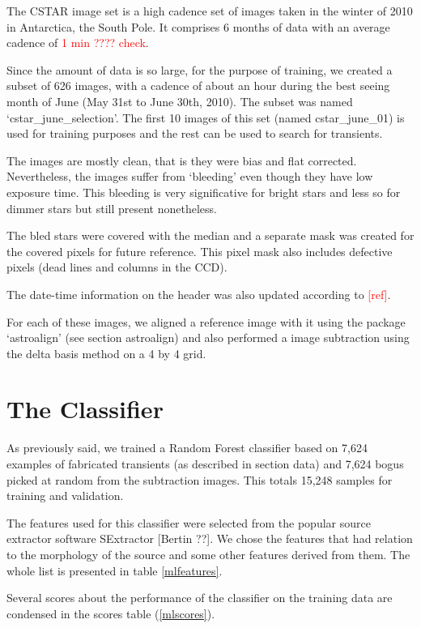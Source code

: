 The CSTAR image set is a high cadence set of images taken in the winter of 2010 in Antarctica, the South Pole. It comprises 6 months of data with an average cadence of \textcolor{red}{1 min ???? check}.

Since the amount of data is so large, for the purpose of training, we created a subset of 626 images, with a cadence of about an hour during the best seeing month of June (May 31st to June 30th, 2010). The subset was named `cstar\_june\_selection'. The first 10 images of this set (named cstar\_june\_01) is used for training purposes and the rest can be used to search for transients. 

The images are mostly clean, that is they were bias and flat corrected.
Nevertheless, the images suffer from `bleeding' even though they have low exposure time. This bleeding is very significative for bright stars and less so for dimmer stars but still present nonetheless.

The bled stars were covered with the median and a separate mask was created for the covered pixels for future reference. This pixel mask also includes defective pixels (dead lines and columns in the CCD).

The date-time information on the header was also updated according to \textcolor{red}{[ref]}.

For each of these images, we aligned a reference image with it using the package `astroalign' (see section astroalign) and also performed a image subtraction using the delta basis method on a 4 by 4 grid.

\section{The Classifier}

As previously said, we trained a Random Forest classifier based on 7,624 examples of fabricated transients (as described in section data) and 7,624 bogus picked at random from the subtraction images. This totals 15,248 samples for training and validation.

The features used for this classifier were selected from the popular source extractor software SExtractor [Bertin ??]. We chose the features that had relation to the morphology of the source and some other features derived from them.
The whole list is presented in table \ref{mlfeatures}.

Several scores about the performance of the classifier on the training data are condensed in the scores table (\ref{mlscores}).

